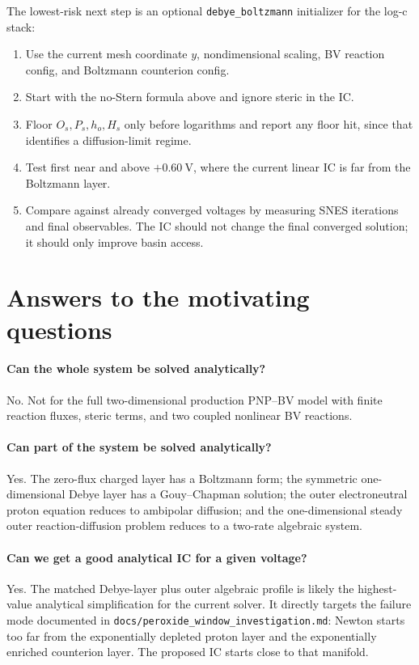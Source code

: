 \documentclass[11pt]{article}
\begin{document}
The lowest-risk next step is an optional \texttt{debye\_boltzmann}
initializer for the log-c stack:
\begin{enumerate}
  \item Use the current mesh coordinate \(y\), nondimensional scaling, BV
        reaction config, and Boltzmann counterion config.
  \item Start with the no-Stern formula above and ignore steric in the IC.
  \item Floor \(O_s,P_s,h_o,H_s\) only before logarithms and report any floor
        hit, since that identifies a diffusion-limit regime.
  \item Test first near and above \(+0.60~\mathrm{V}\), where the current
        linear IC is far from the Boltzmann layer.
  \item Compare against already converged voltages by measuring SNES
        iterations and final observables. The IC should not change the final
        converged solution; it should only improve basin access.
\end{enumerate}

\section{Answers to the motivating questions}

\paragraph{Can the whole system be solved analytically?}
No. Not for the full two-dimensional production PNP--BV model with finite
reaction fluxes, steric terms, and two coupled nonlinear BV reactions.

\paragraph{Can part of the system be solved analytically?}
Yes. The zero-flux charged layer has a Boltzmann form; the symmetric
one-dimensional Debye layer has a Gouy--Chapman solution; the outer
electroneutral proton equation reduces to ambipolar diffusion; and the
one-dimensional steady outer reaction-diffusion problem reduces to a
two-rate algebraic system.

\paragraph{Can we get a good analytical IC for a given voltage?}
Yes. The matched Debye-layer plus outer algebraic profile is likely the
highest-value analytical simplification for the current solver. It directly
targets the failure mode documented in
\texttt{docs/peroxide\_window\_investigation.md}: Newton starts too far from
the exponentially depleted proton layer and the exponentially enriched
counterion layer. The proposed IC starts close to that manifold.
\end{document}
